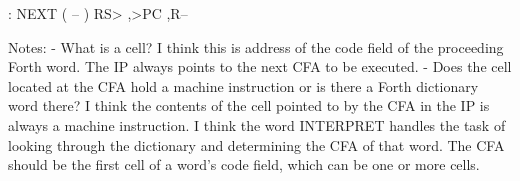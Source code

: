 \documentclass[
    letterpaper, %
	fontsize=10pt, %
	twoside=true, %
	numbers=noenddot, %
]{kaobook}
\begin{document}
    : NEXT ( -- )
        RS> ,>PC ,R--


Notes:
   - What is a cell? I think this is address of the code field of the
   proceeding Forth word. The IP always points to the next CFA to be
   executed.
   - Does the cell located at the CFA hold a machine instruction or
   is there a Forth dictionary word there? I think the contents of the
   cell pointed to by the CFA in the IP is always a machine instruction.
   I think the word INTERPRET handles the task of looking through the
   dictionary and determining the CFA of that word. The CFA should be
   the first cell of a word's code field, which can be one or more cells.
























%

\end{document}
